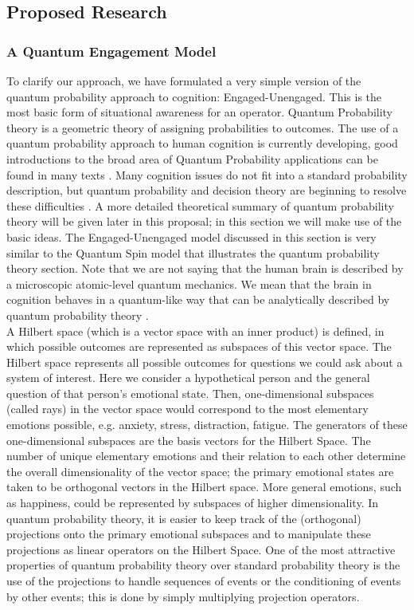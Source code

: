 \subsection{Proposed Research}
\subsubsection{A Quantum Engagement Model}
To clarify our approach, we have formulated a very simple version of the quantum probability approach to cognition: Engaged-Unengaged. This is the most basic form of situational awareness for an operator. Quantum Probability theory is a geometric theory of assigning probabilities to outcomes. The use of a quantum probability approach to human cognition is currently developing, good introductions to the broad area of Quantum Probability applications can be found in many texts \cite{Busemeyer2012,Khrennikov2003,Schwartz2005}. Many cognition issues do not fit into a standard probability description, but quantum probability and decision theory are beginning to resolve these difficulties \cite{Ashtiani2015,Yukalov1998}. A more detailed theoretical summary of quantum probability theory will be given later in this proposal; in this section we will make use of the basic ideas. The Engaged-Unengaged model discussed in this section is very similar to the Quantum Spin model that illustrates the quantum probability theory section. Note that we are not saying that the human brain is described by a microscopic atomic-level quantum mechanics. We mean that the brain in cognition behaves in a quantum-like way that can be analytically described by quantum probability theory \cite{Blutner}.\\

A Hilbert space (which is a vector space with an inner product) is defined, in which possible outcomes are represented as subspaces of this vector space. The Hilbert space represents all possible outcomes for questions we could ask about a system of interest. Here we consider a hypothetical person and the general question of that person's emotional state. Then, one-dimensional subspaces (called rays) in the vector space would correspond to the most elementary emotions possible, e.g. anxiety, stress, distraction, fatigue. The generators of these one-dimensional subspaces are the basis vectors for the Hilbert Space. The number of unique elementary emotions and their relation to each other determine the overall dimensionality of the vector space; the primary emotional states are taken to be orthogonal vectors in the Hilbert space.  More general emotions, such as happiness, could be represented by subspaces of higher dimensionality. In quantum probability theory, it is easier to keep track of the (orthogonal) projections onto the primary emotional subspaces and to manipulate these projections as linear operators on the Hilbert Space. One of the most attractive properties of quantum probability theory over standard probability theory is the use of the projections to handle sequences of events or the conditioning of events by other events; this is done by simply multiplying projection operators.\\

